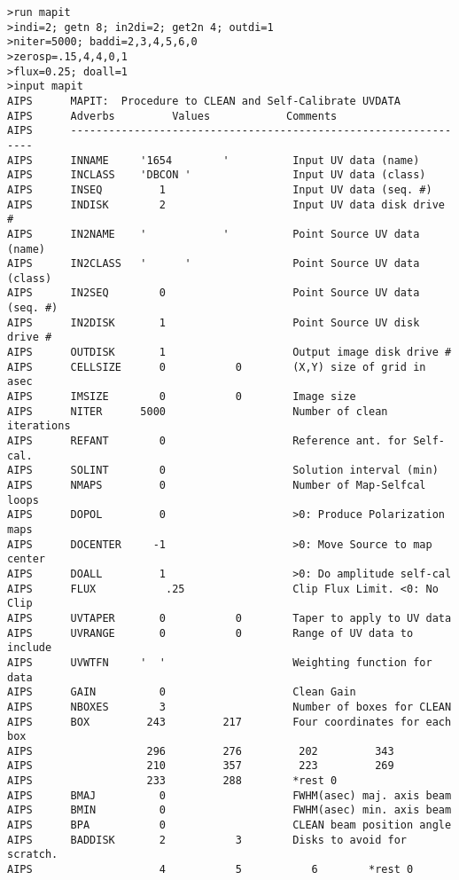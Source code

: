 \begin{verbatim}
>run mapit
>indi=2; getn 8; in2di=2; get2n 4; outdi=1
>niter=5000; baddi=2,3,4,5,6,0
>zerosp=.15,4,4,0,1
>flux=0.25; doall=1
>input mapit
AIPS      MAPIT:  Procedure to CLEAN and Self-Calibrate UVDATA
AIPS      Adverbs         Values            Comments
AIPS      ----------------------------------------------------------------
AIPS      INNAME     '1654        '          Input UV data (name)
AIPS      INCLASS    'DBCON '                Input UV data (class)
AIPS      INSEQ         1                    Input UV data (seq. #)
AIPS      INDISK        2                    Input UV data disk drive #
AIPS      IN2NAME    '            '          Point Source UV data (name)
AIPS      IN2CLASS   '      '                Point Source UV data (class)
AIPS      IN2SEQ        0                    Point Source UV data (seq. #)
AIPS      IN2DISK       1                    Point Source UV disk drive #
AIPS      OUTDISK       1                    Output image disk drive #
AIPS      CELLSIZE      0           0        (X,Y) size of grid in asec
AIPS      IMSIZE        0           0        Image size
AIPS      NITER      5000                    Number of clean iterations
AIPS      REFANT        0                    Reference ant. for Self-cal.
AIPS      SOLINT        0                    Solution interval (min)
AIPS      NMAPS         0                    Number of Map-Selfcal loops
AIPS      DOPOL         0                    >0: Produce Polarization maps
AIPS      DOCENTER     -1                    >0: Move Source to map center
AIPS      DOALL         1                    >0: Do amplitude self-cal
AIPS      FLUX           .25                 Clip Flux Limit. <0: No Clip
AIPS      UVTAPER       0           0        Taper to apply to UV data
AIPS      UVRANGE       0           0        Range of UV data to include
AIPS      UVWTFN     '  '                    Weighting function for data
AIPS      GAIN          0                    Clean Gain
AIPS      NBOXES        3                    Number of boxes for CLEAN
AIPS      BOX         243         217        Four coordinates for each box
AIPS                  296         276         202         343
AIPS                  210         357         223         269
AIPS                  233         288        *rest 0
AIPS      BMAJ          0                    FWHM(asec) maj. axis beam
AIPS      BMIN          0                    FWHM(asec) min. axis beam
AIPS      BPA           0                    CLEAN beam position angle
AIPS      BADDISK       2           3        Disks to avoid for scratch.
AIPS                    4           5           6        *rest 0


\end{verbatim}
